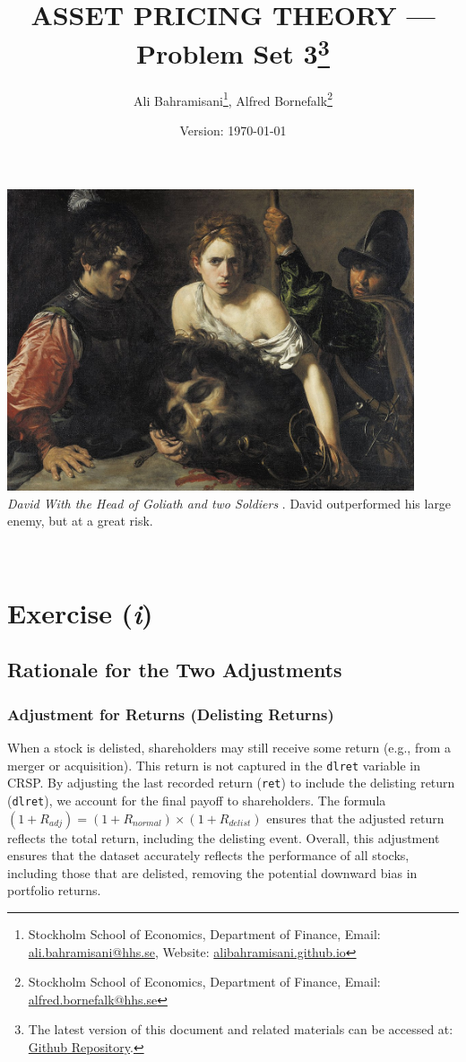 \documentclass[a4paper,10pt,american]{article}
\title{ASSET PRICING THEORY --- Problem Set 3\thanks{
    The latest version of this document and related 
    materials can be accessed at: 
    \href{https://github.com/AliBahramiSani/TAP_Com_Crsp_CAPM.git}{Github Repository}.
}}
\author{Ali Bahramisani\thanks{Stockholm School
of Economics, Department of Finance, Email: 
\href{mailto:ali.bahramisani@hhs.se}{ali.bahramisani@hhs.se}, 
Website: \href{https://alibahramisani.github.io}{alibahramisani.github.io}},
Alfred Bornefalk\thanks{Stockholm School
of Economics, Department of Finance, Email: 
\href{mailto:alfred.bornefalk@hhs.se}{alfred.bornefalk@hhs.se}}}
\date{Version: \today}
\begin{document}
\maketitle
\vspace{1cm}
    \begin{center}
        \includegraphics[width=0.9\textwidth]{DG.jpg} \\[1ex]
        {\footnotesize \textit{David With the Head of Goliath and two Soldiers} \citep{valentin_boulogne_david}. 
        David outperformed his large enemy, but at a great risk.}
    \end{center}
    \vfill
\thispagestyle{empty}



\newpage
{}

\section*{Exercise (\textit{i})}
\subsection*{Rationale for the Two Adjustments}
\subsubsection*{Adjustment for Returns (Delisting Returns)}
When a stock is delisted, shareholders may still receive some return 
(e.g., from a merger or acquisition). This return is not captured in the
\texttt{dlret} variable in CRSP. By adjusting the last recorded return 
(\texttt{ret}) to include the delisting return (\texttt{dlret}), 
we account for the final payoff to shareholders. The formula
$(1+R_{adj}) = (1+R_{normal})\times (1+R_{delist})$ ensures that the
adjusted return reflects the total return, including the delisting event.
Overall, this adjustment ensures that the dataset accurately reflects the 
performance of all stocks, including those that are delisted, removing the 
potential downward bias in portfolio returns.
\end{document}
